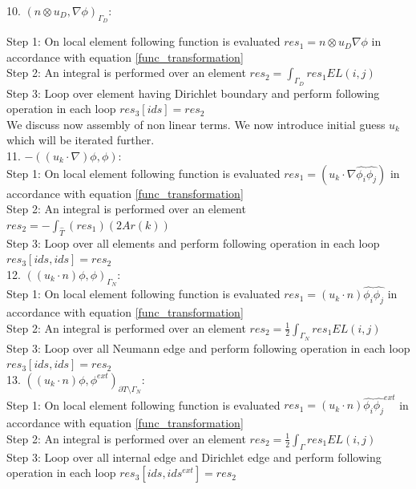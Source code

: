 \documentclass[a4paper]{book}
\begin{document}
10. $(n \otimes u_D,\nabla \phi)_{\Gamma_D} $:

Step 1: On local element following function is evaluated $res_1= n \otimes u_D  \nabla \phi$ in accordance with equation \ref{func_transformation}\\
Step 2: An integral is performed over an element $res_2=\int_{\Gamma_D} res_1 EL(i,j)$\\
Step 3: Loop over element having Dirichlet boundary and perform following operation in each loop $res_3[ids]=res_2$\\

We discuss now assembly of non linear terms. We now introduce initial guess $u_k$ which will be iterated further.\\

11. $-((u_k \cdot \nabla)\phi , \phi)$:\\
Step 1: On local element following function is evaluated $res_1 = (u_k \cdot \nabla \hat{\phi_i} \hat{\phi_j}) $ in accordance with equation \ref{func_transformation}\\
Step 2: An integral is performed over an element $res_2= - \int_{\hat{T}} (res_1) (2Ar(k))$\\
Step 3: Loop over all elements and perform following operation in each loop $res_3[ids,ids]=res_2$\\

12. $((u_k \cdot n)\phi , \phi)_{\Gamma_N}$:\\
Step 1: On local element following function is evaluated $res_1 = (u_k \cdot n) \hat{\phi_i} \hat{\phi_j}$ in accordance with equation \ref{func_transformation}\\
Step 2: An integral is performed over an element $res_2 = \frac{1}{2}  \int_{\Gamma_N} res_1 EL(i,j) $\\
Step 3: Loop over all Neumann edge and perform following operation in each loop $res_3[ids,ids] = res_2$\\

13. $((u_k \cdot n)\phi,\phi^{ext})_{\partial T \setminus \Gamma_N}$:\\
Step 1: On local element following function is evaluated $res_1 = (u_k \cdot n) \hat{\phi_i} \hat{\phi_j}^{ext} $ in accordance with equation \ref{func_transformation}\\
Step 2: An integral is performed over an element $res_2 = \frac{1}{2} \int_{\Gamma} res_1 EL(i,j) $\\
Step 3: Loop over all internal edge and Dirichlet edge and perform following operation in each loop $res_3[ids,ids^{ext}] = res_2$\\
\end{document}
